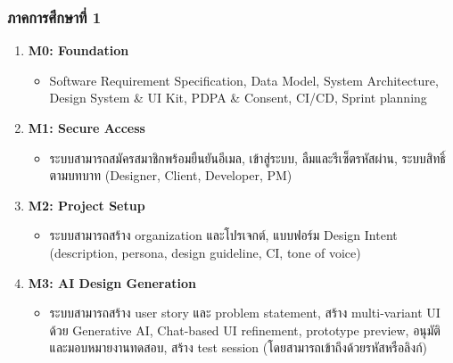 \documentclass[a4paper,oneside]{cpe-thesis-th}
\begin{document}
\subsubsection{ภาคการศึกษาที่ 1}
\begin{enumerate}
  \item \textbf{M0: Foundation}
  \begin{itemize}
    \item Software Requirement Specification, Data Model, System Architecture, Design System \& UI Kit, PDPA \& Consent, CI/CD, Sprint planning
  \end{itemize}
  \item \textbf{M1: Secure Access}
  \begin{itemize}
    \item ระบบสามารถสมัครสมาชิกพร้อมยืนยันอีเมล, เข้าสู่ระบบ, ลืมและรีเซ็ตรหัสผ่าน, ระบบสิทธิ์ตามบทบาท (Designer, Client, Developer, PM)
  \end{itemize}
  \item \textbf{M2: Project Setup}
  \begin{itemize}
    \item ระบบสามารถสร้าง organization และโปรเจกต์, แบบฟอร์ม Design Intent (description, persona, design guideline, CI, tone of voice)
  \end{itemize}
  \item \textbf{M3: AI Design Generation}
  \begin{itemize}
    \item ระบบสามารถสร้าง user story และ problem statement, สร้าง multi-variant UI ด้วย Generative AI, Chat-based UI refinement, prototype preview, อนุมัติและมอบหมายงานทดสอบ, สร้าง test session (โดยสามารถเข้าถึงด้วยรหัสหรือลิงก์)
  \end{itemize}
\end{enumerate}
\end{document}
